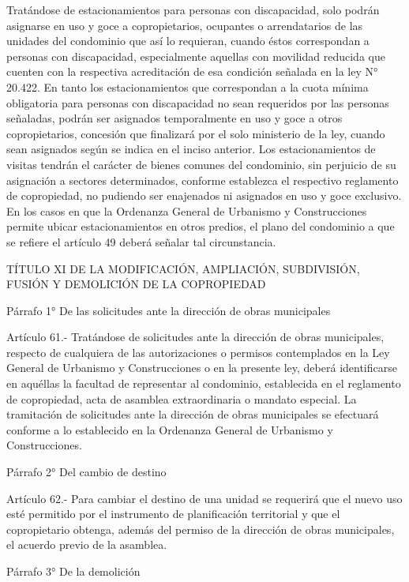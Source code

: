     Tratándose de estacionamientos para personas con discapacidad, solo podrán asignarse en uso y goce a copropietarios, ocupantes o arrendatarios de las unidades del condominio que así lo requieran, cuando éstos correspondan a personas con discapacidad, especialmente aquellas con movilidad reducida que cuenten con la respectiva acreditación de esa condición señalada en la ley N° 20.422.
    En tanto los estacionamientos que correspondan a la cuota mínima obligatoria para personas con discapacidad no sean requeridos por las personas señaladas, podrán ser asignados temporalmente en uso y goce a otros copropietarios, concesión que finalizará por el solo ministerio de la ley, cuando sean asignados según se indica en el inciso anterior.
    Los estacionamientos de visitas tendrán el carácter de bienes comunes del condominio, sin perjuicio de su asignación a sectores determinados, conforme establezca el respectivo reglamento de copropiedad, no pudiendo ser enajenados ni asignados en uso y goce exclusivo.
    En los casos en que la Ordenanza General de Urbanismo y Construcciones permite ubicar estacionamientos en otros predios, el plano del condominio a que se refiere el artículo 49 deberá señalar tal circunstancia.



    TÍTULO XI
    DE LA MODIFICACIÓN, AMPLIACIÓN, SUBDIVISIÓN, FUSIÓN Y DEMOLICIÓN DE LA COPROPIEDAD


    Párrafo 1°
    De las solicitudes ante la dirección de obras municipales
   
    Artículo 61.- Tratándose de solicitudes ante la dirección de obras municipales, respecto de cualquiera de las autorizaciones o permisos contemplados en la Ley General de Urbanismo y Construcciones o en la presente ley, deberá identificarse en aquéllas la facultad de representar al condominio, establecida en el reglamento de copropiedad, acta de asamblea extraordinaria o mandato especial.
    La tramitación de solicitudes ante la dirección de obras municipales se efectuará conforme a lo establecido en la Ordenanza General de Urbanismo y Construcciones.
   
    Párrafo 2°
    Del cambio de destino

     
    Artículo 62.- Para cambiar el destino de una unidad se requerirá que el nuevo uso esté permitido por el instrumento de planificación territorial y que el copropietario obtenga, además del permiso de la dirección de obras municipales, el acuerdo previo de la asamblea.
     
    Párrafo 3°
    De la demolición
   

